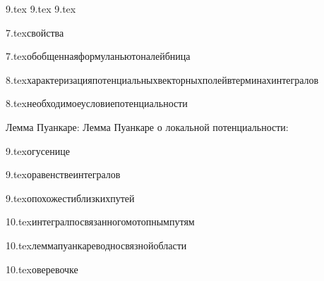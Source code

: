 {9.tex}{}\?
{9.tex}{}\?
{9.tex}{}\?

{7.tex}{свойства}

{7.tex}{обобщеннаяформуланьютоналейбница}

{8.tex}{характеризацияпотенциальныхвекторныхполейвтерминахинтегралов}

{8.tex}{необходимоеусловиепотенциальности}

Лемма Пуанкаре:
Лемма Пуанкаре о локальной потенциальности:

{9.tex}{огусенице}

{9.tex}{оравенствеинтегралов}

{9.tex}{опохожестиблизкихпутей}

{10.tex}{интегралпосвязанногомотопнымпутям}

{10.tex}{леммапуанкареводносвязнойобласти}

{10.tex}{оверевочке}

